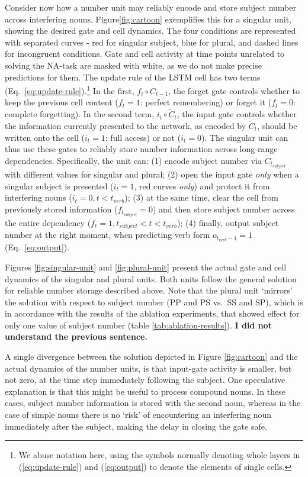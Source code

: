Consider now how a number unit may reliably encode and store subject
number across interfering nouns.  Figure\ref{fig:cartoon} exemplifies
this for a singular unit, showing the desired gate and cell
dynamics. The four conditions are represented with separated curves -
red for singular subject, blue for plural, and dashed lines for
incongruent conditions. Gate and cell activity at time points
unrelated to solving the NA-task are masked with white, as we do not
make precise predictions for them. The update rule of the LSTM cell
has two terms (Eq.~\ref{eq:update-rule}).\footnote{We abuse notation
  here, using the symbols normally denoting whole layers in
  (\ref{eq:update-rule}) and (\ref{eq:output}) to denote the elements of single
  cells.} In the first, $f_t \circ{} C_{t-1}$, the forget gate
controls whether to keep the previous cell content ($f_t=1$: perfect
remembering) or forget it ($f_t=0$: complete forgetting). In the
second term, $i_t\circ{} \tilde{C}_t$, the input gate controls whether
the information currently presented to the network, as encoded by
$\tilde{C}_t$, should be written onto the cell ($i_t=1$: full access)
or not ($i_t=0$). The singular unit can thus use these gates to
reliably store number information across long-range
dependencies. Specifically, the unit can: (1) encode subject number
via $\tilde{C}_{t_{subject}}$ with different values for singular and
plural; (2) open the input gate \textit{only} when a singular subject
is presented ($i_t=1$, red curves \textit{only}) and protect it from
interfering nouns ($i_t=0, t<t_{verb}$); (3) at the same time, clear
the cell from previously stored information ($f_{t_{subject}}=0$) and
then store subject number across the entire dependency
($f_t=1, t_{subject}<t<t_{verb}$); (4) finally, output subject number
at the right moment, when predicting verb form $o_{t_{verb}-1}=1$
(Eq.~\ref{eq:output}).

Figures \ref{fig:singular-unit} and \ref{fig:plural-unit} present the actual gate and cell dynamics of the singular and plural units. Both units follow the general solution for reliable number storage described above. Note that the plural unit `mirrors' the solution with respect to subject number (PP and PS vs.~SS and SP), which is in accordance with the results of the ablation experiments, that showed effect for only one value of subject number (table \ref{tab:ablation-results}). \textbf{I did not understand the previous sentence.} 

A single divergence between the solution depicted in Figure \ref{fig:cartoon} and the actual dynamics of the number units, is that input-gate activity is smaller, but not zero, at the time step immediately following the subject. One speculative explanation is that this might be useful to process compound nouns. In these cases, subject number information is stored with the second noun, whereas in the case of simple nouns there is no `risk' of encountering an interfering noun immediately after the subject, making the delay in closing the gate safe.

